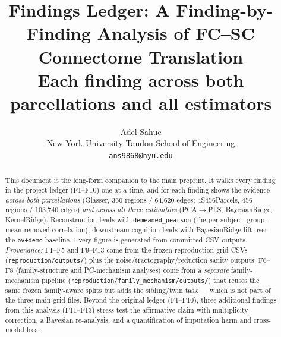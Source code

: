 \documentclass{article}
\title{Findings Ledger: A Finding-by-Finding Analysis of FC--SC Connectome Translation\\
\large Each finding across both parcellations and all estimators}
\author{Adel Sahuc \\ New York University Tandon School of Engineering \\ \texttt{ans9868@nyu.edu}}
\newcommand{\dpear}{\texttt{demeaned\_pearson}}
\newcommand{\bvdemo}{\texttt{bv+demo}}
\begin{document}
\maketitle

\begin{abstract}
This document is the long-form companion to the main preprint. It walks every finding in the
project ledger (F1--F10) one at a time, and for each finding shows the evidence \emph{across
both parcellations} (Glasser, 360 regions / 64{,}620 edges; 4S456Parcels, 456 regions /
103{,}740 edges) \emph{and across all three estimators} (PCA$\rightarrow$PLS, BayesianRidge,
KernelRidge). Reconstruction leads with \dpear{} (the per-subject, group-mean-removed
correlation); downstream cognition leads with BayesianRidge lift over the \bvdemo{} baseline.
Every figure is generated from committed CSV outputs. \emph{Provenance:} F1--F5 and F9--F13
come from the frozen reproduction-grid CSVs (\texttt{reproduction/outputs/}) plus the
noise/tractography/reduction sanity outputs; F6--F8 (family-structure and PC-mechanism
analyses) come from a \emph{separate} family-mechanism pipeline
(\texttt{reproduction/family\_mechanism/outputs/}) that reuses the same frozen family-aware
splits but adds the sibling/twin task --- which is not part of the three main grid files.
Beyond the original ledger (F1--F10), three additional findings from this analysis (F11--F13)
stress-test the affirmative claim with multiplicity correction, a Bayesian re-analysis, and a
quantification of imputation harm and cross-modal loss.
\end{abstract}
\end{document}
